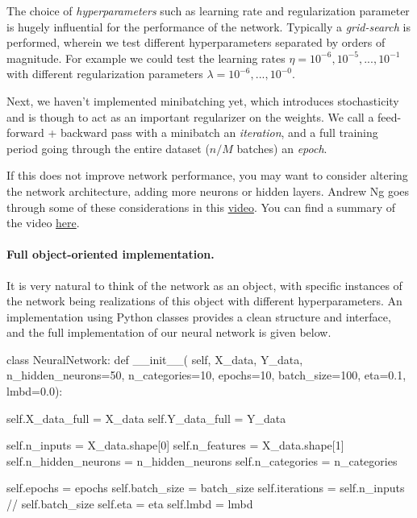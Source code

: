 \documentclass[%
oneside,                 %
final,                   %
10pt]{article}
\begin{document}
The choice of \emph{hyperparameters} such as learning rate and regularization parameter is hugely influential for the performance of the network. Typically a \emph{grid-search} is performed, wherein we test different hyperparameters separated by orders of magnitude. For example we could test the learning rates $\eta = 10^{-6}, 10^{-5},...,10^{-1}$ with different regularization parameters $\lambda = 10^{-6},...,10^{-0}$.  

Next, we haven't implemented minibatching yet, which introduces stochasticity and is though to act as an important regularizer on the weights. We call a feed-forward + backward pass with a minibatch an \emph{iteration}, and a full training period
going through the entire dataset ($n/M$ batches) an \emph{epoch}.

If this does not improve network performance, you may want to consider altering the network architecture, adding more neurons or hidden layers.  
Andrew Ng goes through some of these considerations in this \href{{https://youtu.be/F1ka6a13S9I}}{video}. You can find a summary of the video \href{{https://kevinzakka.github.io/2016/09/26/applying-deep-learning/}}{here}.  

\paragraph{Full object-oriented implementation.}
It is very natural to think of the network as an object, with specific instances of the network
being realizations of this object with different hyperparameters. An implementation using Python classes provides a clean structure and interface, and the full implementation of our neural network is given below.


\bpycod
class NeuralNetwork:
    def __init__(
            self,
            X_data,
            Y_data,
            n_hidden_neurons=50,
            n_categories=10,
            epochs=10,
            batch_size=100,
            eta=0.1,
            lmbd=0.0):

        self.X_data_full = X_data
        self.Y_data_full = Y_data

        self.n_inputs = X_data.shape[0]
        self.n_features = X_data.shape[1]
        self.n_hidden_neurons = n_hidden_neurons
        self.n_categories = n_categories

        self.epochs = epochs
        self.batch_size = batch_size
        self.iterations = self.n_inputs // self.batch_size
        self.eta = eta
        self.lmbd = lmbd
\end{document}
